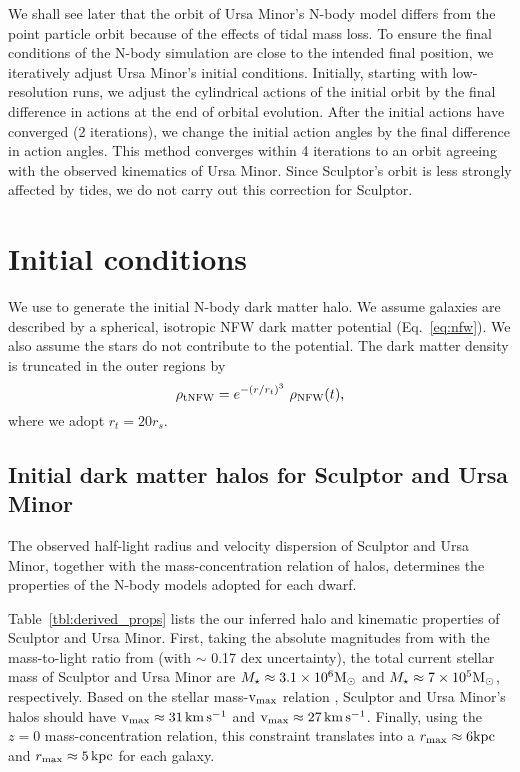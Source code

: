 We shall see later that the orbit of Ursa Minor's N-body model differs
from the point particle orbit because of the effects of tidal mass loss.
To ensure the final conditions of the N-body simulation are close to the
intended final position, we iteratively adjust Ursa Minor's initial
conditions. Initially, starting with low-resolution runs, we adjust the
cylindrical actions of the initial orbit by the final difference in
actions at the end of orbital evolution. After the initial actions have
converged (2 iterations), we change the initial action angles by the
final difference in action angles. This method converges within 4
iterations to an orbit agreeing with the observed kinematics of Ursa
Minor. Since Sculptor's orbit is less strongly affected by tides, we do
not carry out this correction for Sculptor.

\section{Initial conditions}\label{initial-conditions}

We use \agama{} \citep{agama} to generate the initial N-body dark matter
halo. We assume galaxies are described by a spherical, isotropic NFW
dark matter potential (Eq.~\ref{eq:nfw}). We also assume the stars do
not contribute to the potential. The dark matter density is truncated in
the outer regions by \begin{equation}{
\rho_{\rm tNFW} = e^{-(r/r_t)^3}\ \rho_{\rm NFW}(t),
}\end{equation} where we adopt \(r_t = 20 r_s\).

\subsection{Initial dark matter halos for Sculptor and Ursa
Minor}\label{initial-dark-matter-halos-for-sculptor-and-ursa-minor}

The observed half-light radius and velocity dispersion of Sculptor and
Ursa Minor, together with the mass-concentration relation of \LCDM{}
halos, determines the properties of the N-body models adopted for each
dwarf.

Table~\ref{tbl:derived_props} lists the our inferred halo and kinematic
properties of Sculptor and Ursa Minor. First, taking the absolute
magnitudes from \citet{munoz+2018} with the mass-to-light ratio from
\citet{woo+courteau+dekel2008} (with \(\sim\) 0.17 dex uncertainty), the
total current stellar mass of Sculptor and Ursa Minor are
\(M_\star \approx 3.1 \times 10^6 {\rm M}_{\odot}\) and
\(M_\star \approx 7 \times 10^5 {\rm M}_{\odot}\), respectively. Based on the
stellar mass-\({\rm v}_{\rm max}\) relation \citep[from][]{fattahi+2018}, Sculptor
and Ursa Minor's halos should have \({\rm v}_{\rm max} \approx 31 \,{\rm km\,s^{-1}}\) and
\({\rm v}_{\rm max} \approx 27\,{\rm km\,s^{-1}}\). Finally, using the \citet{ludlow+2016}
\(z=0\) mass-concentration relation, this constraint translates into a
\(r_{\rm max} \approx 6 {\rm kpc}\) and \(r_{\rm max} \approx 5\,{\rm kpc}\) for each
galaxy.


